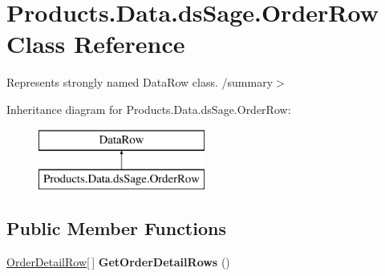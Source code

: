 \hypertarget{class_products_1_1_data_1_1ds_sage_1_1_order_row}{}\section{Products.\+Data.\+ds\+Sage.\+Order\+Row Class Reference}
\label{class_products_1_1_data_1_1ds_sage_1_1_order_row}


Represents strongly named Data\+Row class. /summary$>$  


Inheritance diagram for Products.\+Data.\+ds\+Sage.\+Order\+Row\+:\begin{figure}[H]
\begin{center}
\leavevmode
\includegraphics[height=2.000000cm]{class_products_1_1_data_1_1ds_sage_1_1_order_row}
\end{center}
\end{figure}
\subsection*{Public Member Functions}
\begin{DoxyCompactItemize}
\item 
\hyperlink{class_products_1_1_data_1_1ds_sage_1_1_order_detail_row}{Order\+Detail\+Row}\mbox{[}$\,$\mbox{]} {\bfseries Get\+Order\+Detail\+Rows} ()\hypertarget{class_products_1_1_data_1_1ds_sage_1_1_order_row_ae7b49888b0f9eccdc6e3dbc057e11c68}{}\label{class_products_1_1_data_1_1ds_sage_1_1_order_row_ae7b49888b0f9eccdc6e3dbc057e11c68}

\end{DoxyCompactItemize}
